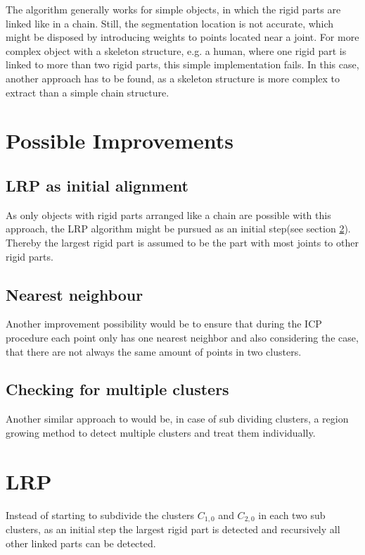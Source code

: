\documentclass[notitlepage,english]{hgbreport}
\begin{document}
	The algorithm generally works for simple objects, in which the rigid parts are linked like in a chain. Still, the segmentation location is not accurate, which might be disposed by introducing weights to points located near a joint. For more complex object with a skeleton structure, e.g. a human, where one rigid part is linked to more than two rigid parts, this simple implementation fails. In this case, another approach has to be found, as a skeleton structure is more complex to extract than a simple chain structure.
	
	\section{Possible Improvements}
	
	\subsection{LRP as initial alignment}
	
	As only objects with rigid parts arranged like a chain are possible with this approach, the LRP algorithm might be pursued as an initial step(see section \ref{sec:LRP}). Thereby the largest rigid part is assumed to be the part with most joints to other rigid parts. 
	
	\subsection{Nearest neighbour}
	
	Another improvement possibility would be to ensure that during the ICP procedure each point only has one nearest neighbor and also considering the case, that there are not always the same amount of points in two clusters. 
	
	\subsection{Checking for multiple clusters}
	Another similar approach to \cite{guo2016correspondence} would be, in case of sub dividing clusters, a region growing method to detect multiple clusters and treat them individually.
	
	\section{LRP}
	\label{sec:LRP}
	Instead of starting to subdivide the clusters $C_{1,0}$ and $C_{2,0}$ in each two sub clusters, as an initial step the largest rigid part is detected and recursively all other linked parts can be detected.
	
\end{document}

